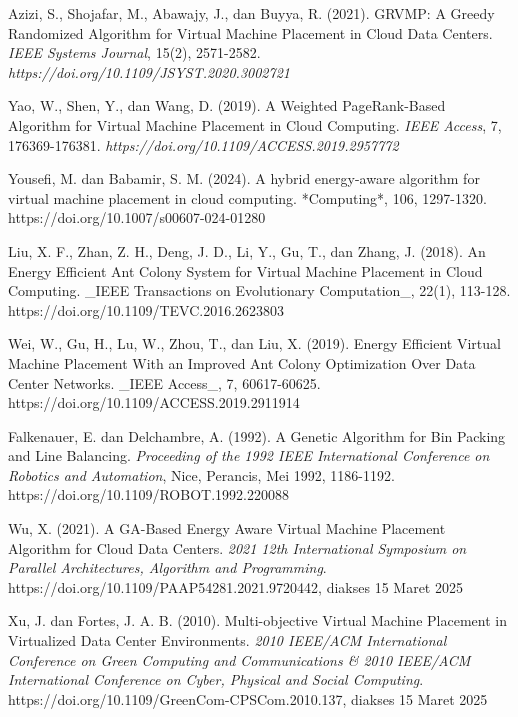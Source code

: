 \begin{thebibliography}{99}
	Azizi, S., Shojafar, M., Abawajy, J., dan Buyya, R. (2021). GRVMP: A Greedy Randomized Algorithm for Virtual Machine Placement in Cloud Data Centers. \textit{IEEE Systems Journal}, 15(2), 2571-2582. \textit{https://doi.org/10.1109/JSYST.2020.3002721}
	
	Yao, W., Shen, Y., dan Wang, D. (2019). A Weighted PageRank-Based Algorithm for Virtual Machine Placement in Cloud Computing. \textit{IEEE Access}, 7, 176369-176381. \textit{https://doi.org/10.1109/ACCESS.2019.2957772}
	
	Yousefi, M. dan Babamir, S. M. (2024). A hybrid energy-aware algorithm for virtual machine placement in cloud computing. *Computing*, 106, 1297-1320. https://doi.org/10.1007/s00607-024-01280
	
	Liu, X. F., Zhan, Z. H., Deng, J. D., Li, Y., Gu, T., dan Zhang, J. (2018). An Energy Efficient Ant Colony System for Virtual Machine Placement in Cloud Computing. _IEEE Transactions on Evolutionary Computation_, 22(1), 113-128. https://doi.org/10.1109/TEVC.2016.2623803
	
	Wei, W., Gu, H., Lu, W., Zhou, T., dan Liu, X. (2019). Energy Efficient Virtual Machine Placement With an Improved Ant Colony Optimization Over Data Center Networks. _IEEE Access_, 7, 60617-60625. https://doi.org/10.1109/ACCESS.2019.2911914 
	
	Falkenauer, E. dan Delchambre, A. (1992). A Genetic Algorithm for Bin Packing and Line Balancing. \textit{Proceeding of the 1992 IEEE International Conference on Robotics and Automation}, Nice, Perancis, Mei 1992, 1186-1192. https://doi.org/10.1109/ROBOT.1992.220088

	Wu, X. (2021). A GA-Based Energy Aware Virtual Machine Placement Algorithm for Cloud Data Centers. \textit{2021 12th International Symposium on Parallel Architectures, Algorithm and Programming}. https://doi.org/10.1109/PAAP54281.2021.9720442, diakses 15 Maret 2025

	Xu, J. dan Fortes, J. A. B. (2010). Multi-objective Virtual Machine Placement in Virtualized Data Center Environments. \textit{2010 IEEE/ACM International Conference on Green Computing and Communications & 2010 IEEE/ACM International Conference on Cyber, Physical and Social Computing}. https://doi.org/10.1109/GreenCom-CPSCom.2010.137, diakses 15 Maret 2025


\end{thebibliography}
